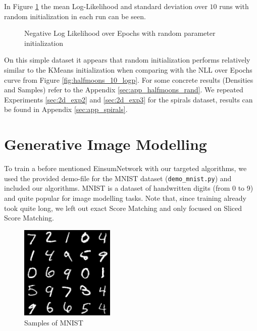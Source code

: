 In Figure \ref{fig:halfmoons_10_random_logp} the mean Log-Likelihood and standard deviation over $10$ runs with random initialization in each run can be seen. 

\begin{figure}[H]
    \centering
    \caption{Negative Log Likelihood over Epochs with random parameter initialization}
    \label{fig:halfmoons_10_random_logp}
\end{figure}

On this simple dataset it appears that random initialization performs relatively similar to the KMeans initialization when comparing with the NLL over Epochs curve from Figure \ref{fig:halfmoons_10_logp}. For some concrete results (Densities and Samples) refer to the Appendix \ref{sec:app_halfmoons_rand}.
We repeated Experiments \ref{sec:2d_exp2} and \ref{sec:2d_exp3} for the spirals dataset, results can be found in Appendix \ref{sec:app_spirals}.

\section{Generative Image Modelling}

To train a before mentioned EinsumNetwork \cite{einsum} with our targeted algorithms, we used the provided demo-file for the MNIST \cite{mnist} dataset (\texttt{demo\_mnist.py}) and included 
our algorithms. MNIST is a dataset of handwritten digits (from 0 to 9) and quite popular for image modelling tasks.
Note that, since training already took quite long, we left out exact Score Matching and only focused on Sliced Score Matching. 

\begin{figure}[H]
    \centering
    \includegraphics[width=0.4\textwidth]{figures/einsum/mnist/[]_ground_truth.png}
    \caption{Samples of MNIST}
\end{figure}

